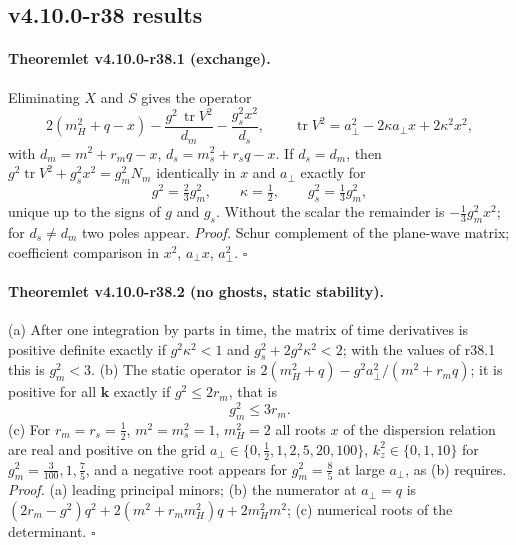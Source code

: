 \subsection*{v4.10.0-r38 results}
\label{subsec:v4100-r38-results}

\paragraph{Theoremlet v4.10.0-r38.1 (exchange).}
Eliminating \(X\) and \(S\) gives the operator
\[
 2(m_H^2+q-x)-\frac{g^2\,\operatorname{tr}V^2}{d_m}-\frac{g_s^2x^2}{d_s},\qquad \operatorname{tr}V^2=a_\perp^2-2\kappa a_\perp x+2\kappa^2x^2,
\]
with \(d_m=m^2+r_mq-x\), \(d_s=m_s^2+r_sq-x\).  If \(d_s=d_m\), then \(g^2\operatorname{tr}V^2+g_s^2x^2=g_m^2N_m\) identically in \(x\) and \(a_\perp\) exactly for
\[
 g^2=\tfrac23g_m^2,\qquad \kappa=\tfrac12,\qquad g_s^2=\tfrac13g_m^2,
\]
unique up to the signs of \(g\) and \(g_s\).  Without the scalar the remainder is \(-\tfrac13g_m^2x^2\); for \(d_s\neq d_m\) two poles appear.
\emph{Proof.} Schur complement of the plane-wave matrix; coefficient comparison in \(x^2\), \(a_\perp x\), \(a_\perp^2\).  \(\square\)

\paragraph{Theoremlet v4.10.0-r38.2 (no ghosts, static stability).}
(a) After one integration by parts in time, the matrix of time derivatives is positive definite exactly if \(g^2\kappa^2<1\) and
\(g_s^2+2g^2\kappa^2<2\); with the values of r38.1 this is \(g_m^2<3\).
(b) The static operator is \(2(m_H^2+q)-g^2a_\perp^2/(m^2+r_mq)\); it is positive for all \(\mathbf k\) exactly if \(g^2\le2r_m\), that is
\[
 g_m^2\le3r_m .
\]
(c) For \(r_m=r_s=\tfrac12\), \(m^2=m_s^2=1\), \(m_H^2=2\) all roots \(x\) of the dispersion relation are real and positive on the grid
\(a_\perp\in\{0,\tfrac12,1,2,5,20,100\}\), \(k_z^2\in\{0,1,10\}\) for \(g_m^2=\tfrac3{100},1,\tfrac75\), and a negative root appears for \(g_m^2=\tfrac85\) at large
\(a_\perp\), as (b) requires.  \emph{Proof.} (a) leading principal minors; (b) the numerator at \(a_\perp=q\) is
\((2r_m-g^2)q^2+2(m^2+r_mm_H^2)q+2m_H^2m^2\); (c) numerical roots of the determinant.  \(\square\)


